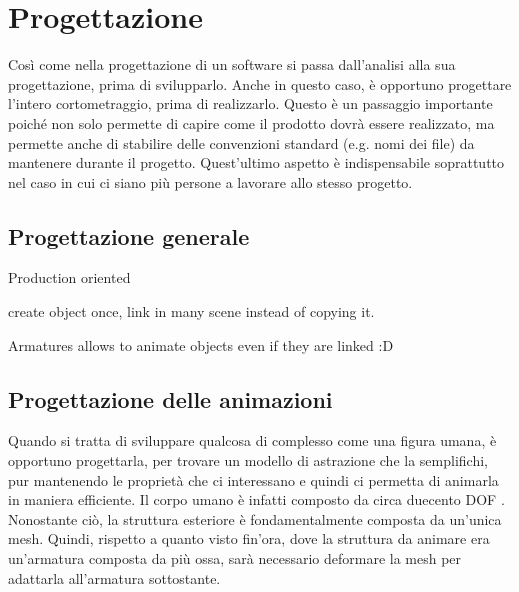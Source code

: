
\chapter{Progettazione} %

\label{Chapter4} %

Così come nella progettazione di un software si passa dall'analisi alla sua progettazione, prima di svilupparlo. Anche in questo caso, è opportuno progettare l'intero cortometraggio, prima di realizzarlo.
Questo è un passaggio importante poiché non solo permette di capire come il prodotto dovrà essere realizzato, ma permette anche di stabilire delle convenzioni standard (e.g. nomi dei file) da mantenere durante il progetto.
Quest'ultimo aspetto è indispensabile soprattutto nel caso in cui ci siano più persone a lavorare allo stesso progetto.


\section{Progettazione generale}

Production oriented



create object once, link in many scene instead of copying it.

Armatures allows to animate objects even if they are linked :D

\section{Progettazione delle animazioni}

Quando si tratta di sviluppare qualcosa di complesso come una figura umana, è opportuno progettarla, per trovare un modello di astrazione che la semplifichi, pur mantenendo le proprietà che ci interessano e quindi ci permetta di animarla in maniera efficiente.
Il corpo umano è infatti composto da circa duecento DOF \cite{Parent:2012:CAA:2385444}.
Nonostante ciò, la struttura esteriore è fondamentalmente composta da un'unica mesh.
Quindi, rispetto a quanto visto fin'ora, dove la struttura da animare era un'armatura composta da più ossa, sarà necessario deformare la mesh per adattarla all'armatura sottostante.

